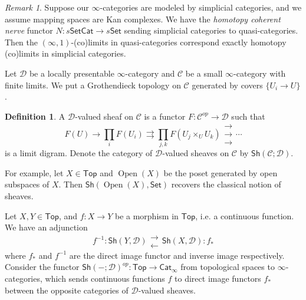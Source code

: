 \documentclass[12pt]{amsart}
\theoremstyle{definition}
\newtheorem{defn}[thm]{Definition}
\theoremstyle{remark}
\newtheorem{rem}[thm]{Remark}
\numberwithin{equation}{section}
\newcommand{\1}{{\mathbb{1}}}
\newcommand{\set}{\mathsf{Set}}
\newcommand{\sh}{\mathsf{Sh}}
\newcommand{\Top}{\mathsf{Top}}
\newcommand{\cat}{\mathsf{Cat}}
\newcommand{\open}{\operatorname{Open}}
\begin{document}
\begin{rem}
	Suppose our $\infty$-categories are modeled by simplicial categories, and we assume mapping spaces are Kan complexes. We have the {\it homotopy coherent nerve} functor $N:s\set\cat \to s\set$ sending simplicial categories to quasi-categories. Then the $(\infty,1)$-(co)limits in quasi-categories correspond exactly homotopy (co)limits in simplicial categories. 
\end{rem}


Let $\mathcal{D}$ be a locally presentable $\infty$-category and $\mathcal{C}$ be a small $\infty$-category with finite limits. We put a Grothendieck topology on $\mathcal{C}$ generated by covers $\{U_i\to U \}$.

\begin{defn}
	A $\mathcal{D}$-valued sheaf on $\mathcal{C}$ is a functor $F: \mathcal{C}^{op}\to \mathcal{D}$ such that 
	\begin{equation*}
	F(U) \to \prod_i F(U_i) \rightrightarrows \prod_{j,k} F(U_j\times_{U}U_k)\substack{\rightarrow\\[-1em] \rightarrow \\[-1em] \rightarrow} \cdots
	\end{equation*}
	is a limit digram. Denote the category of $\mathcal{D}$-valued sheaves on $\mathcal{C}$ by $\sh(\mathcal{C};\mathcal{D})$.
\end{defn}
For example, let $X\in \Top$ and $\open(X)$ be the poset generated by open subspaces of $X$. Then $\sh(\open(X),\set)$ recovers the classical notion of sheaves.

Let $X, Y\in \Top$,  and $f: X\to Y$ be a morphism in $\Top$, i.e. a continuous function. We have an adjunction
\begin{equation*}
f^{-1}: \sh(Y,\mathcal{D}) \substack{\longrightarrow\\[-1em]  \longleftarrow}\sh(X,\mathcal{D}): f_*
\end{equation*}
where $f_*$ and $f^{-1}$ are the direct image functor and inverse image respectively. Consider the functor $\sh(-;\mathcal{D})^{op}: \Top\to \cat_{\infty}$ from topological spaces to $\infty$-categories, which sends continuous functions $f$ to direct image functors $f_{*}$ between the opposite categories of $\mathcal{D}$-valued sheaves.
\end{document}
